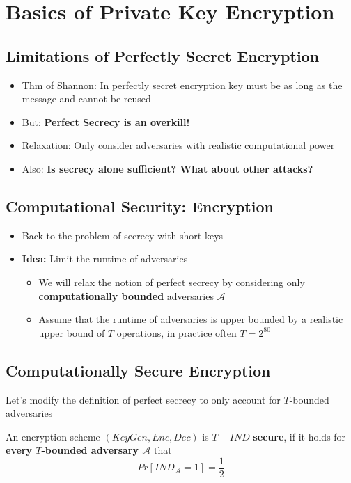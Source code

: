 

\chapter{Basics of Private Key Encryption}
	
	\section{Limitations of Perfectly Secret Encryption}
		\begin{itemize}
			\item Thm of Shannon: In perfectly secret encryption key must be as long as the message and cannot be reused
			\item But: \textbf{Perfect Secrecy is an overkill!}
			\item Relaxation: Only consider adversaries with realistic computational power
			\item Also: \textbf{Is secrecy alone sufficient? What about other attacks?}
		\end{itemize}
		
	\section{Computational Security: Encryption}
		\begin{itemize}
			\item Back to the problem of secrecy with short keys
			\item \textbf{Idea:} Limit the runtime of adversaries
			\begin{itemize}
				\item We will relax the notion of perfect secrecy by considering only \textbf{computationally bounded} adversaries $\mathcal{A}$
				\item Assume that the runtime of adversaries is upper bounded by a realistic upper bound of $T$ operations, in practice often $T = 2^{80}$
			\end{itemize}
		\end{itemize}
	
	\section{Computationally Secure Encryption}
		Let's modify the definition of perfect secrecy to only account for $T$-bounded adversaries
		\begin{definition}
			An encryption scheme $(KeyGen,Enc,Dec)$ is $T-IND$ \textbf{secure}, if it holds for \textbf{every $T$-bounded adversary $\mathcal{A}$} that
			$$Pr[IND_{\mathcal{A}} = 1] = \frac{1}{2}$$
		\end{definition}
		
